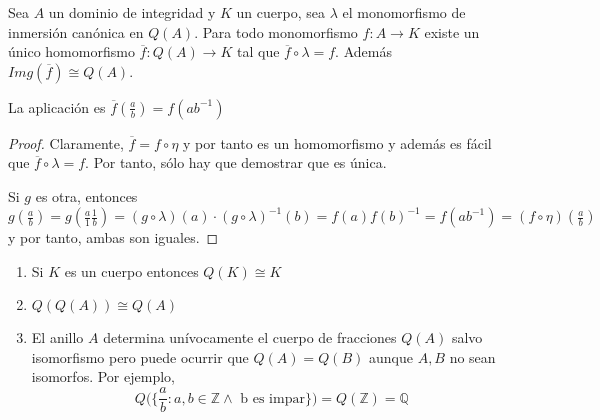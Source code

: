 \begin{corollary}
	Sea $A$ un dominio de integridad y $K$ un cuerpo, sea $\lambda$ el monomorfismo de inmersión canónica en $Q(A)$. Para todo monomorfismo $f: A \to K$ existe un único homomorfismo $\overline{f}:Q(A) \to K$ tal que $\overline{f} \circ \lambda = f$. Además $Img(\overline{f}) \cong Q(A)$.
	

	La aplicación es $\overline{f}(\frac{a}{b}) = f(ab^{-1})$
\end{corollary}
\begin{proof}
	Claramente, $\overline{f} = f \circ \eta$ y por tanto es un homomorfismo y además es fácil que $\overline{f} \circ \lambda = f$. Por tanto, sólo hay que demostrar que es única. 
	
	Si $g$ es otra, entonces $g(\frac{a}{b}) = g(\frac{a}{1} \frac{1}{b}) = (g \circ \lambda)(a) \cdot (g \circ \lambda)^{-1}(b) = f(a)f(b)^{-1} = f(ab^{-1}) = (f \circ \eta)(\frac{a}{b})$ y por tanto, ambas son iguales. 
\end{proof}

\begin{example}
	\begin{enumerate}
		\item Si $K$ es un cuerpo entonces $Q(K) \cong K$
		\item $Q(Q(A)) \cong Q(A)$
		\item El anillo $A$ determina unívocamente el cuerpo de fracciones $Q(A)$ salvo isomorfismo pero puede ocurrir que $Q(A) = Q(B)$ aunque $A,B$ no sean isomorfos. Por ejemplo, $$Q\Big(\{\frac{a}{b}:a,b \in \mathbb{Z} \land \text{ b es impar}\}\Big) = Q(\mathbb{Z}) = \mathbb{Q}$$
	\end{enumerate}
\end{example}

